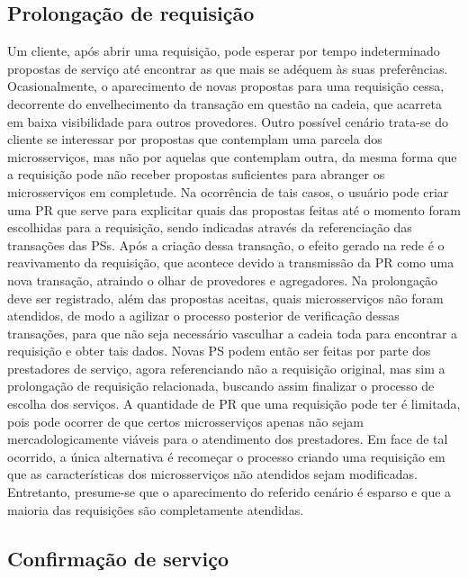 \subsection{Prolongação de requisição}
\label{subsec:proposta:contratual:pr}
%
Um cliente, após abrir uma requisição, pode esperar por tempo indeterminado propostas de serviço até encontrar as que mais se adéquem às suas preferências. Ocasionalmente, o aparecimento de novas propostas para uma requisição cessa, decorrente do envelhecimento da transação em questão na cadeia, que acarreta em baixa visibilidade para outros provedores. Outro possível cenário trata-se do cliente se interessar por propostas que contemplam uma parcela dos microsserviços, mas não por aquelas que contemplam outra, da mesma forma que a requisição pode não receber propostas suficientes para abranger os microsserviços em completude. Na ocorrência de tais casos, o usuário pode criar uma \ac{PR} que serve para explicitar quais das propostas feitas até o momento foram escolhidas para a requisição, sendo indicadas através da referenciação das transações das \acp{PS}. Após a criação dessa transação, o efeito gerado na rede é o reavivamento da requisição, que acontece devido a transmissão da \ac{PR} como uma nova transação, atraindo o olhar de provedores e agregadores. Na prolongação deve ser registrado, além das propostas aceitas, quais microsserviços não foram atendidos, de modo a agilizar o processo posterior de verificação dessas transações, para que não seja necessário vasculhar a cadeia toda para encontrar a requisição e obter tais dados.
%
Novas \ac{PS} podem então ser feitas por parte dos prestadores de serviço, agora referenciando não a requisição original, mas sim a prolongação de requisição relacionada, buscando assim finalizar o processo de escolha dos serviços. A quantidade de \ac{PR} que uma requisição pode ter é limitada, pois pode ocorrer de que certos microsserviços apenas não sejam mercadologicamente viáveis para o atendimento dos prestadores. Em face de tal ocorrido, a única alternativa é recomeçar o processo criando uma requisição em que as características dos microsserviços não atendidos sejam modificadas. Entretanto, presume-se que o aparecimento do referido cenário é esparso e que a maioria das requisições são completamente atendidas.

\subsection{Confirmação de serviço}
\label{subsec:proposta:contratual:di}

